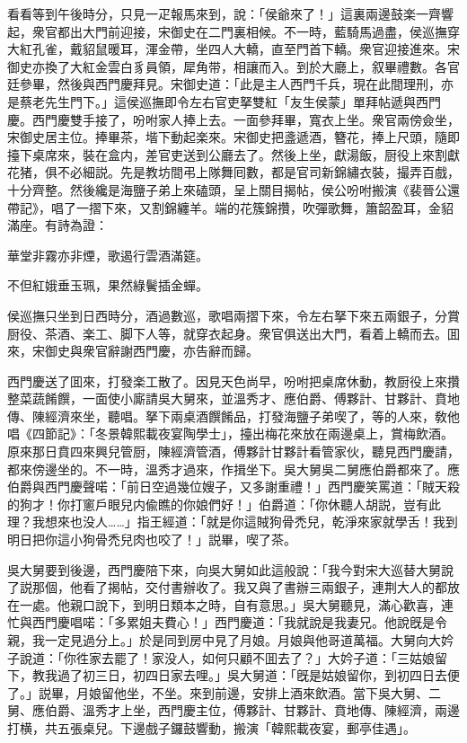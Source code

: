 看看等到午後時分，只見一疋報馬來到，說：「侯爺來了！」這裏兩邊鼓楽一齊響起，衆官都出大門前迎接，宋御史在二門裏相候。不一時，藍騎馬過盡，侯巡撫穿大紅孔雀，戴貂鼠暖耳，渾金帶，坐四人大轎，直至門首下轎。衆官迎接進來。宋御史亦換了大紅金雲白豸員領，犀角带，相讓而入。到於大廳上，叙畢禮數。各官廷參畢，然後與西門慶拜見。宋御史道：「此是主人西門千兵，現在此間理刑，亦是蔡老先生門下。」這侯巡撫即令左右官吏拏雙紅「友生侯蒙」單拜帖遞與西門慶。西門慶雙手接了，吩咐家人捧上去。一面參拜畢，寬衣上坐。衆官兩傍僉坐，宋御史居主位。捧畢茶，堦下動起楽來。宋御史把盞遞酒，簪花，捧上尺頭，隨即擡下桌席來，裝在盒内，差官吏送到公廳去了。然後上坐，獻湯飯，厨役上來割獻花猪，俱不必細説。先是教坊間弔上隊舞囘數，都是官司新錦繡衣裝，撮弄百戲，十分齊整。然後纔是海鹽子弟上來磕頭，呈上關目揭帖，侯公吩咐搬演《裴晉公還帶記》，唱了一摺下來，又割錦纏羊。端的花簇錦攢，吹彈歌舞，簫韶盈耳，金貂滿座。有詩為證：

\begin{myquote}
華堂非霧亦非煙，歌遏行雲酒滿筵。

不但紅娥垂玉珮，果然綠鬢插金蟬。
\end{myquote}

侯巡撫只坐到日西時分，酒過數巡，歌唱兩摺下來，令左右拏下來五兩銀子，分賞厨役、茶酒、楽工、脚下人等，就穿衣起身。衆官俱送出大門，看着上轎而去。囬來，宋御史與衆官辭謝西門慶，亦告辭而歸。

西門慶送了囬來，打發楽工散了。因見天色尚早，吩咐把桌席休動，教厨役上來攢整菜蔬餚饌，一面使小廝請吳大舅來，並溫秀才、應伯爵、傅夥計、甘夥計、賁地傳、陳經濟來坐，聽唱。拏下兩桌酒饌餚品，打發海鹽子弟喫了，等的人來，敎他唱《四節記》：「冬景韓熙載夜宴陶學士」，擡出梅花來放在兩邊桌上，賞梅飲酒。原來那日賁四來興兒管厨，陳經濟管酒，傅夥計甘夥計看管家伙，聽見西門慶請，都來傍邊坐的。不一時，溫秀才過來，作揖坐下。吳大舅吳二舅應伯爵都來了。應伯爵與西門慶聲喏：「前日空過幾位嫂子，又多謝重禮！」西門慶笑罵道：「賊天殺的狗才！你打窻戶眼兒内偸瞧的你娘們好！」伯爵道：「你休聽人胡説，豈有此理？我想來也没人……」指王經道：「就是你這賊狗骨禿兒，乾淨來家就學舌！我到明日把你這小狗骨禿兒肉也咬了！」説畢，喫了茶。

吳大舅要到後邊，西門慶陪下來，向吳大舅如此這般說：「我今對宋大巡替大舅說了説那個，他看了揭帖，交付書辦收了。我又與了書辦三兩銀子，連荆大人的都放在一處。他親口說下，到明日類本之時，自有意思。」吳大舅聽見，滿心歡喜，連忙與西門慶唱喏：「多累姐夫費心！」西門慶道：「我就說是我妻兄。他說旣是令親，我一定見過分上。」於是同到房中見了月娘。月娘與他哥道萬福。大舅向大妗子說道：「你徃家去罷了！家没人，如何只顧不囬去了？」大妗子道：「三姑娘留下，教我過了初三日，初四日家去哩。」吳大舅道：「旣是姑娘留你，到初四日去便了。」説畢，月娘留他坐，不坐。來到前邊，安排上酒來飲酒。當下吳大舅、二舅、應伯爵、溫秀才上坐，西門慶主位，傅夥計、甘夥計、賁地傳、陳經濟，兩邊打横，共五張桌兒。下邊戲子鑼鼓響動，搬演「韓熙載夜宴，郵亭佳遇」。

